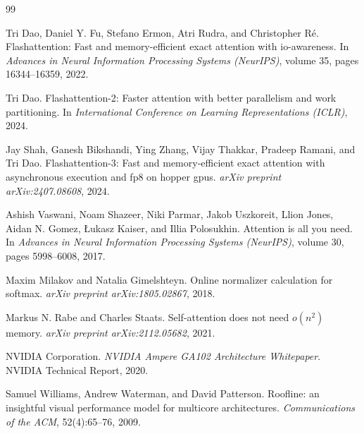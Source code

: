 \documentclass[10pt,a4paper]{article}
\begin{document}
\begin{thebibliography}{99}

Tri Dao, Daniel Y. Fu, Stefano Ermon, Atri Rudra, and Christopher R{\'e}.
\newblock Flashattention: Fast and memory-efficient exact attention with io-awareness.
\newblock In \emph{Advances in Neural Information Processing Systems (NeurIPS)}, volume 35, pages 16344--16359, 2022.

Tri Dao.
\newblock Flashattention-2: Faster attention with better parallelism and work partitioning.
\newblock In \emph{International Conference on Learning Representations (ICLR)}, 2024.

Jay Shah, Ganesh Bikshandi, Ying Zhang, Vijay Thakkar, Pradeep Ramani, and Tri Dao.
\newblock Flashattention-3: Fast and memory-efficient exact attention with asynchronous execution and fp8 on hopper gpus.
\newblock \emph{arXiv preprint arXiv:2407.08608}, 2024.

Ashish Vaswani, Noam Shazeer, Niki Parmar, Jakob Uszkoreit, Llion Jones, Aidan N. Gomez, {\L}ukasz Kaiser, and Illia Polosukhin.
\newblock Attention is all you need.
\newblock In \emph{Advances in Neural Information Processing Systems (NeurIPS)}, volume 30, pages 5998--6008, 2017.

Maxim Milakov and Natalia Gimelshteyn.
\newblock Online normalizer calculation for softmax.
\newblock \emph{arXiv preprint arXiv:1805.02867}, 2018.

Markus N. Rabe and Charles Staats.
\newblock Self-attention does not need $o(n^2)$ memory.
\newblock \emph{arXiv preprint arXiv:2112.05682}, 2021.

NVIDIA Corporation.
\newblock \emph{NVIDIA Ampere GA102 Architecture Whitepaper}.
\newblock NVIDIA Technical Report, 2020.

Samuel Williams, Andrew Waterman, and David Patterson.
\newblock Roofline: an insightful visual performance model for multicore architectures.
\newblock \emph{Communications of the ACM}, 52(4):65--76, 2009.

\end{thebibliography}
\end{document}
